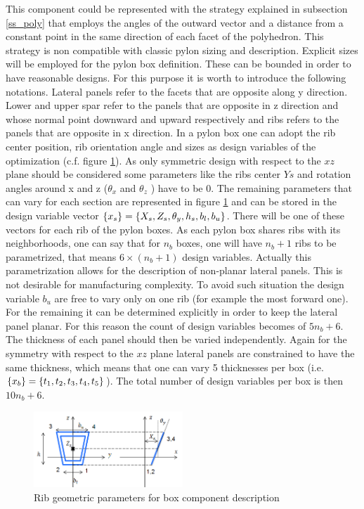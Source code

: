 This component could be represented with the strategy explained in subsection \ref{ss_poly} that employs the angles of the outward vector and a distance from a constant point in the same direction of each facet of the polyhedron. This strategy is non compatible with classic pylon sizing and description.  Explicit sizes will be employed for the pylon box definition. These can be bounded in order to have reasonable designs. For this purpose it is worth to introduce the following notations. Lateral panels refer to the facets that are opposite along y direction. Lower and upper spar refer to the panels that are opposite in z direction and whose normal point downward and upward respectively and ribs refers to the panels  that are opposite in x direction. In a pylon box one can adopt the rib center position, rib orientation angle and sizes as design variables of the optimization (c.f. figure \ref{fig:3.41}). As only symmetric design with respect to the $xz$ plane should be considered some parameters like the ribs center $Ys$ and rotation angles around x and z ($\theta_x$ and $\theta_z$ ) have to be 0. The remaining parameters that can vary for each section are represented in figure \ref{fig:3.41} and can be stored in the design variable vector $\left\lbrace{x_s}\right \rbrace=\left\lbrace{X_s,Z_s,\theta_y,h_s,b_l,b_u}\right \rbrace$. There will be one of these vectors for each rib of the pylon boxes. As each pylon box shares ribs with its neighborhoods, one can say that for $n_b$ boxes, one will  have $n_b+1$ ribs to be parametrized, that means $6\times(n_b+1)$ design variables. Actually this parametrization allows for the description of non-planar lateral panels. This is not desirable for manufacturing complexity. To avoid such situation the design variable $b_u$ are free to vary only on one rib (for example the most forward one). For the remaining it can be determined explicitly in order to keep the lateral panel planar. For this reason the count of design variables becomes of $5n_b+6$. The thickness of each panel should then be varied independently. Again for the symmetry with respect to the $xz$ plane lateral panels are constrained to have the same thickness, which means that one can vary 5 thicknesses per box (i.e. $\left\lbrace{x_b}\right \rbrace=\left\lbrace{t_1,t_2,t_3,t_4,t_5}\right \rbrace$). The total number of design variables per box is then $10n_b+6$. 
  \begin{figure}[!ht]
        \centering
         \includegraphics[width=0.5\textwidth]{images/Ch3/box_section_parameters}
       \caption{Rib geometric parameters for box component description}
       \label{fig:3.41}       %
  \end{figure}
